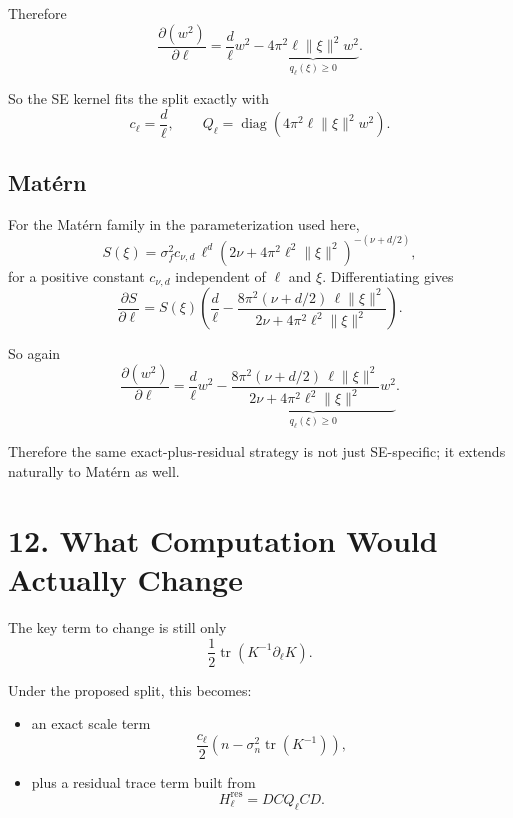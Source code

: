 \documentclass[11pt]{article}
\begin{document}
Therefore
\begin{equation}
\frac{\partial (w^2)}{\partial \ell}
=
\frac{d}{\ell} w^2
-
\underbrace{4\pi^2 \ell \|\xi\|^2 w^2}_{q_\ell(\xi) \ge 0}.
\end{equation}

So the SE kernel fits the split exactly with
\begin{equation}
c_\ell = \frac{d}{\ell},
\qquad
Q_\ell = \operatorname{diag}\!\left(4\pi^2 \ell \|\xi\|^2 w^2\right).
\end{equation}

\subsection*{Mat\'ern}

For the Mat\'ern family in the parameterization used here,
\begin{equation}
S(\xi)
=
\sigma_f^2 c_{\nu,d}\,
\ell^d
\left(2\nu + 4\pi^2 \ell^2 \|\xi\|^2\right)^{-(\nu + d/2)},
\end{equation}
for a positive constant $c_{\nu,d}$ independent of $\ell$ and $\xi$.
Differentiating gives
\begin{equation}
\frac{\partial S}{\partial \ell}
=
S(\xi)
\left(
\frac{d}{\ell}
-
\frac{8\pi^2(\nu + d/2)\,\ell \|\xi\|^2}
{2\nu + 4\pi^2 \ell^2 \|\xi\|^2}
\right).
\end{equation}

So again
\begin{equation}
\frac{\partial (w^2)}{\partial \ell}
=
\frac{d}{\ell} w^2
-
\underbrace{
\frac{8\pi^2(\nu + d/2)\,\ell \|\xi\|^2}
{2\nu + 4\pi^2 \ell^2 \|\xi\|^2}
w^2
}_{q_\ell(\xi) \ge 0}.
\end{equation}

Therefore the same exact-plus-residual strategy is not just SE-specific; it
extends naturally to Mat\'ern as well.

\section*{12. What Computation Would Actually Change}

The key term to change is still only
\[
\frac{1}{2}\operatorname{tr}\!\left(K^{-1}\partial_\ell K\right).
\]

Under the proposed split, this becomes:
\begin{itemize}
  \item an exact scale term
  \[
    \frac{c_\ell}{2}\left(n - \sigma_n^2 \operatorname{tr}(K^{-1})\right),
  \]
  \item plus a residual trace term built from
  \[
    H_\ell^{\mathrm{res}} = D C Q_\ell C D.
  \]
\end{itemize}
\end{document}
